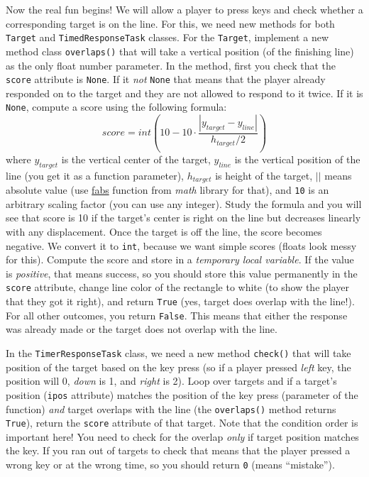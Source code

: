 \documentclass[
]{book}
\begin{document}
Now the real fun begins! We will allow a player to press keys and check whether a corresponding target is on the line. For this, we need new methods for both \texttt{Target} and \texttt{TimedResponseTask} classes. For the \texttt{Target}, implement a new method class \texttt{overlaps()} that will take a vertical position (of the finishing line) as the only float number parameter. In the method, first you check that the \texttt{score} attribute is \texttt{None}. If it \emph{not} \texttt{None} that means that the player already responded on to the target and they are not allowed to respond to it twice. If it is \texttt{None}, compute a score using the following formula:
\[score = int \left(10 - 10 \cdot \frac{|y_{target} - y_{line}|}{h_{target} / 2} \right)\]
where \(y_{target}\) is the vertical center of the target, \(y_{line}\) is the vertical position of the line (you get it as a function parameter), \(h_{target}\) is height of the target, \(||\) means absolute value (use \href{https://docs.python.org/3/library/math.html\#math.fabs}{fabs} function from \emph{math} library for that), and \texttt{10} is an arbitrary scaling factor (you can use any integer). Study the formula and you will see that score is 10 if the target's center is right on the line but decreases linearly with any displacement. Once the target is off the line, the score becomes negative. We convert it to \texttt{int}, because we want simple scores (floats look messy for this). Compute the score and store in a \emph{temporary local variable}. If the value is \emph{positive}, that means success, so you should store this value permanently in the \texttt{score} attribute, change line color of the rectangle to white (to show the player that they got it right), and return \texttt{True} (yes, target does overlap with the line!). For all other outcomes, you return \texttt{False}. This means that either the response was already made or the target does not overlap with the line.

In the \texttt{TimerResponseTask} class, we need a new method \texttt{check()} that will take position of the target based on the key press (so if a player pressed \emph{left} key, the position will 0, \emph{down} is 1, and \emph{right} is 2). Loop over targets and if a target's position (\texttt{ipos} attribute) matches the position of the key press (parameter of the function) \emph{and} target overlaps with the line (the \texttt{overlaps()} method returns \texttt{True}), return the \texttt{score} attribute of that target. Note that the condition order is important here! You need to check for the overlap \emph{only} if target position matches the key. If you ran out of targets to check that means that the player pressed a wrong key or at the wrong time, so you should return \texttt{0} (means ``mistake'').
\end{document}
